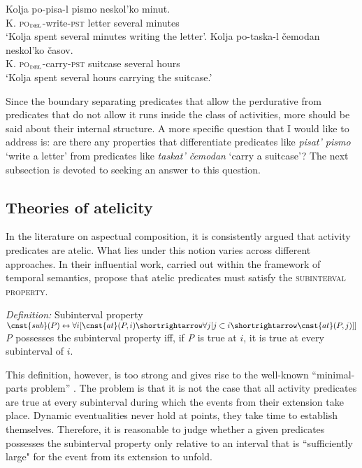\documentclass[output=paper,
]{langscibook}
\begin{document}
\ea \label{ex:naumov:24} \ea \label{ex:naumov:24a}
\gll  Kolja	po-pisa-l		pismo		neskol’ko	minut.\\
K. \textsc{po}$_\textsc{del}$-write-\textsc{pst}   letter		several		minutes    \\      
\glt `Kolja spent several minutes writing the letter'.
\ex \label{ex:naumov:24b}
\gll Kolja	po-taska-l		čemodan	neskol’ko	časov. \\
K. \textsc{po}$_\textsc{del}$-carry-\textsc{pst} suitcase	several		hours \\
\glt `Kolja spent several hours carrying the suitcase.'
\z \z

\noindent Since the boundary separating predicates that allow the perdurative from predicates that do not allow it runs inside the class of activities, more should be said about their internal structure. A more specific question that I would like to address is: are there any properties that differentiate predicates like \textit{pisat’ pismo} `write a letter’ from predicates like \textit{taskat’ čemodan} `carry a suitcase’? The next subsection is devoted to seeking an answer to this question.

\subsection{Theories of atelicity} \label{sec:naumov:3.4}

In the literature on aspectual composition, it is consistently argued that activity predicates are atelic. What lies under this notion varies across different approaches. In their influential work, carried out within the framework of temporal semantics, \citet{bennett1978toward} propose that atelic predicates must satisfy the \textsc{subinterval property}.

\ea \label{ex:naumov:25}
\textit{Definition:} Subinterval property\smallskip\\
$\cnst{sub}(P) \leftrightarrow \forall i [\cnst{at}(P, i) \shortrightarrow \forall j[j \subset i \shortrightarrow \cnst{at}(P, j)]]$ \\
\textit{P} possesses the subinterval property iff, if \textit{P} is true at $i$, it is true at every subinterval of $i$.
\z

\noindent This definition, however, is too strong and gives rise to the well-known ``minimal-parts problem'' \citep{dowty1979word}. The problem is that it is not the case that all activity predicates are true at every subinterval during which the events from their extension take place. Dynamic eventualities never hold at points, they take time to establish themselves. Therefore, it is reasonable to judge whether a given predicates possesses the subinterval property only relative to an interval that is ``sufficiently large" for the event from its extension to unfold.
\end{document}
